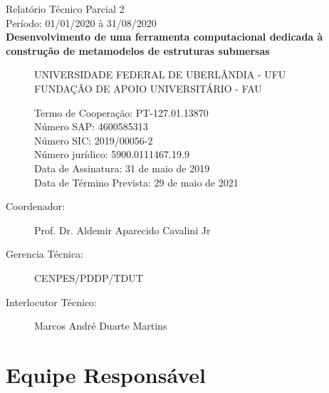 \documentclass[12pt,fleqn,a4paper]{report}
\begin{document}
	\begin{large}
		\begin{center}
			Relatório Técnico Parcial 2\\
			\vspace*{10 pt}
			Período: 01/01/2020 à 31/08/2020\\
			\vspace*{25 pt}
			{\bf Desenvolvimento de uma ferramenta computacional dedicada à construção de metamodelos de estruturas submersas}
		\end{center}
	\end{large}
	
	\vspace*{10 pt}
	\begin{normalsize}
		\begin{description}
			\item[] 
	
			\hspace{0.7cm} UNIVERSIDADE FEDERAL DE UBERLÂNDIA - UFU\\
			FUNDA\c C\~AO DE APOIO UNIVERSITÁRIO - FAU
			\begin{flushleft}
				Termo de Cooperação: PT-127.01.13870 \\
				Número SAP: 4600585313 \\
				Número SIC: 2019/00056-2 \\
				Número jurídico: 5900.0111467.19.9\\
				Data de Assinatura: 31 de maio de 2019\\
				Data de Término Prevista: 29 de maio de 2021
			\end{flushleft}
	
			\vspace{10pt}
			\item[Coordenador:] Prof. Dr. Aldemir Aparecido Cavalini Jr  
			\vspace{10pt}
			\item[Gerencia Técnica:] CENPES/PDDP/TDUT
			\item[Interlocutor Técnico:] Marcos André Duarte Martins
	
		\end{description}
	\end{normalsize}
	
	\newpage
	
	\section*{Equipe Responsável}
\end{document}
